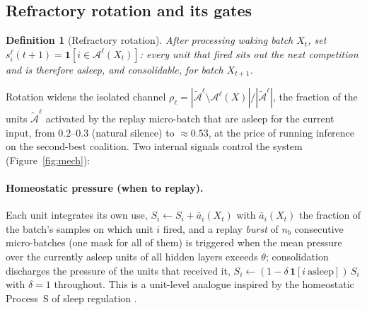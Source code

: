 \documentclass{article}
\newtheorem{definition}{Definition}
\begin{document}
\subsection{Refractory rotation and its gates}
\label{sec:rotation}

\begin{definition}[Refractory rotation]
After processing waking batch $X_t$, set $s^\ell_i(t{+}1) = \mathbf{1}[i \in \mathcal{A}^\ell(X_t)]$:
every unit that fired sits out the next competition and is therefore asleep, and
consolidable, for batch $X_{t+1}$.
\end{definition}

Rotation widens the isolated channel
$\rho_\ell=|\tilde{\mathcal{A}}^\ell\setminus\mathcal{A}^\ell(X)|/|\tilde{\mathcal{A}}^\ell|$, the fraction of
the units $\tilde{\mathcal{A}}^\ell$ activated by the replay micro-batch that are asleep for the current
input, from $0.2$--$0.3$ (natural silence) to $\approx0.53$, at the price of running inference on the second-best coalition. Two internal
signals control the system (Figure~\ref{fig:mech}):

\paragraph{Homeostatic pressure (when to replay).} Each unit integrates its own use,
$S_i \leftarrow S_i + \bar a_i(X_t)$ with $\bar a_i(X_t)$ the fraction of the batch's samples on
which unit $i$ fired, and a replay \emph{burst} of $n_b$ consecutive micro-batches (one mask for
all of them) is triggered when the mean pressure over the currently asleep units of all hidden
layers exceeds $\theta$; consolidation discharges the pressure of the units that received it,
$S_i \leftarrow (1-\delta\,\mathbf{1}[i\ \mathrm{asleep}])\,S_i$ with $\delta=1$ throughout.
This is a unit-level analogue inspired by the homeostatic Process~S of sleep regulation
\citep{borbely1982}.
\end{document}

